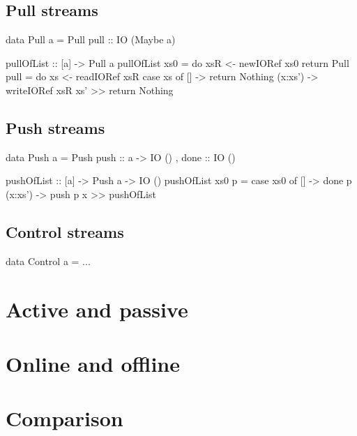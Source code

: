 \subsection{Pull streams}

\begin{code}
data Pull a
 = Pull 
 { pull :: IO (Maybe a) }

pullOfList :: [a] -> Pull a
pullOfList xs0
 = do xsR <- newIORef xs0
      return Pull
       { pull = do
        xs <- readIORef xsR
        case xs of
         []      -> return Nothing
         (x:xs') -> writeIORef xsR xs' >> return Nothing
       }
\end{code}

\subsection{Push streams}
\begin{code}
data Push a = Push
 { push :: a -> IO ()
 , done :: IO () }

pushOfList :: [a] -> Push a -> IO ()
pushOfList xs0 p
 = case xs0 of
    [] -> done p
    (x:xs') -> push p x >> pushOfList
\end{code}

\subsection{Control streams}
\begin{code}
data Control a
 = ...
\end{code}


\section{Active and passive}

\section{Online and offline}

\section{Comparison}

